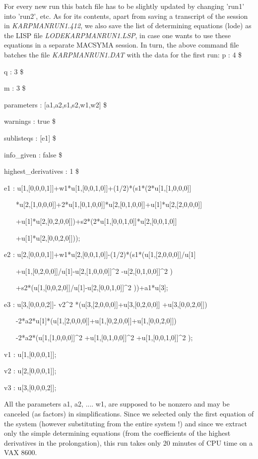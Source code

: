 {\nopagebreak
\noindent
For every new run this batch file has to be slightly updated by changing
'run1' into 'run2', etc.
As for its contents, apart from saving a transcript of the session in
{\em KARPMANRUN1.412}, we also save the list of determining equations (lode)
as the LISP file {\em LODEKARPMANRUN1.LSP}, 
in case one wants to use these equations in a separate MACSYMA session. 
In turn, the above command file batches the file {\em KARPMANRUN1.DAT} with the
data for the first run:
\nopagebreak
\vskip 2pt
p : 4 \$ \par
q : 3 \$ \par
m : 3 \$ \par
\pagebreak
parameters : [a1,a2,s1,s2,w1,w2] \$ \par
warnings : true \$ \par
sublisteqs : [e1] \$ \par
info\_given : false \$ \par
highest\_derivatives : 1 \$ \par
e1 : u[1,[0,0,0,1]]+w1*u[1,[0,0,1,0]]+(1/2)*(s1*(2*u[1,[1,0,0,0]] \par
$\;\;\;\;\;$
*u[2,[1,0,0,0]]+2*u[1,[0,1,0,0]]*u[2,[0,1,0,0]]+u[1]*u[2,[2,0,0,0]] \par
$\;\;\;\;\;$
+u[1]*u[2,[0,2,0,0]])+s2*(2*u[1,[0,0,1,0]]*u[2,[0,0,1,0]] \par
$\;\;\;\;\;$
+u[1]*u[2,[0,0,2,0]])); \par
e2 : u[2,[0,0,0,1]]+w1*u[2,[0,0,1,0]]-(1/2)*(s1*(u[1,[2,0,0,0]]/u[1] \par
$\;\;\;\;\;$
+u[1,[0,2,0,0]]/u[1]-u[2,[1,0,0,0]]\^{}2 -u[2,[0,1,0,0]]\^{}2 ) \par
$\;\;\;\;\;$
+s2*(u[1,[0,0,2,0]]/u[1]-u[2,[0,0,1,0]]\^{}2 ))+a1*u[3]; \par
e3 : u[3,[0,0,0,2]]- v2\^{}2 *(u[3,[2,0,0,0]]+u[3,[0,2,0,0]]
+u[3,[0,0,2,0]]) \par
$\;\;\;\;\;$
-2*a2*u[1]*(u[1,[2,0,0,0]]+u[1,[0,2,0,0]]+u[1,[0,0,2,0]]) \par
$\;\;\;\;\;$
-2*a2*(u[1,[1,0,0,0]]\^{}2 +u[1,[0,1,0,0]]\^{}2 
+u[1,[0,0,1,0]]\^{}2 ); \par
v1 : u[1,[0,0,0,1]]; \par
v2 : u[2,[0,0,0,1]]; \par
v3 : u[3,[0,0,0,2]]; \par
\vskip 2pt
\noindent
\nopagebreak
All the parameters a1, a2, .... w1, are supposed to be nonzero and 
may be canceled (as factors) in simplifications.
Since we selected only the first equation of the system (however substituting
from the entire system !) and since we extract only the simple determining 
equations (from the coefficients of the highest derivatives in the 
prolongation), this run takes only 20 minutes of CPU time on a VAX 8600.

}
